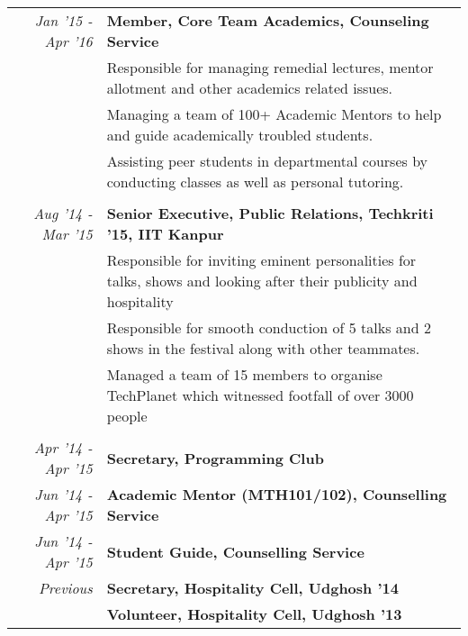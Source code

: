 \documentclass[a4paper]{norm-resume}
\begin{document}
	\begin{tabular}{r|p{16cm}}	
	
	\null \hspace{10mm} \normalsize\emph{Jan '15 - Apr '16} & \textbf{Member, Core Team Academics, Counseling Service}\\
	& \small{Responsible for managing remedial lectures, mentor allotment and other academics related issues.}\\
	& \small{Managing a team of 100+ Academic Mentors to help and guide academically troubled students.}\\
	& \small{Assisting peer students in departmental courses by conducting classes as well as personal tutoring.}\\

	\multicolumn{2}{c}{} \\
	\normalsize\emph{Aug '14 - Mar '15} & \textbf{Senior Executive, Public Relations, Techkriti '15, IIT Kanpur}\\
	& \small{Responsible for inviting eminent personalities for talks, shows and looking after their publicity and hospitality}\\
	& \small{Responsible for smooth conduction of 5 talks and 2 shows in the festival along with other teammates.}\\
	& \small{Managed a team of 15 members to organise TechPlanet which witnessed footfall of over 3000 people}	\\

	\multicolumn{2}{c}{} \\
	\normalsize\emph{Apr '14 - Apr '15} & \normalsize\textbf{Secretary, Programming Club}\\

	\normalsize\emph{Jun '14 - Apr '15} & \normalsize\textbf{Academic Mentor (MTH101/102), Counselling Service}\\ 

	\normalsize\emph{Jun '14 - Apr '15} & \normalsize\textbf{Student Guide, Counselling Service}\\

	\normalsize\emph{Previous} & \normalsize\textbf{Secretary, Hospitality Cell, Udghosh '14}\\
	
	& \normalsize\textbf{Volunteer, Hospitality Cell, Udghosh '13}\\

	\end{tabular}

\vspace{2mm}	%
\end{document}
